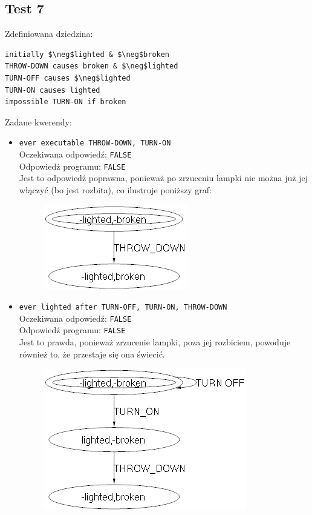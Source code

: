 \documentclass{article}
\begin{document}
\newpage
\subsection{Test 7}

Zdefiniowana dziedzina:
\bigskip
{}
\begin{lstlisting}[mathescape=true]
initially $\neg$lighted & $\neg$broken
THROW-DOWN causes broken & $\neg$lighted
TURN-OFF causes $\neg$lighted
TURN-ON causes lighted
impossible TURN-ON if broken
\end{lstlisting}

\vspace{1cm}

Zadane kwerendy:
\begin{itemize}
    \item {\large\texttt{ever executable THROW-DOWN, TURN-ON}}\\
	Oczekiwana odpowiedź: \texttt{FALSE}\\
    Odpowiedź programu: \texttt{FALSE}\\
    Jest to odpowiedź poprawna, ponieważ po zrzuceniu lampki nie można już jej włączyć (bo jest rozbita), co ilustruje poniższy graf:
    \begin{figure}[H]
    \centering
    \includegraphics[scale=0.5]{7_1}
    \end{figure}
	
    \item {\large\texttt{ever lighted after TURN-OFF, TURN-ON, THROW-DOWN}}\\
	Oczekiwana odpowiedź: \texttt{FALSE}\\
    Odpowiedź programu: \texttt{FALSE}\\
    Jest to prawda, ponieważ zrzucenie lampki, poza jej rozbiciem, powoduje również to, że przestaje się ona świecić.
    \begin{figure}[H]
    \centering
    \includegraphics[scale=0.5]{7_2}
    \end{figure}


\end{itemize}
\end{document}
